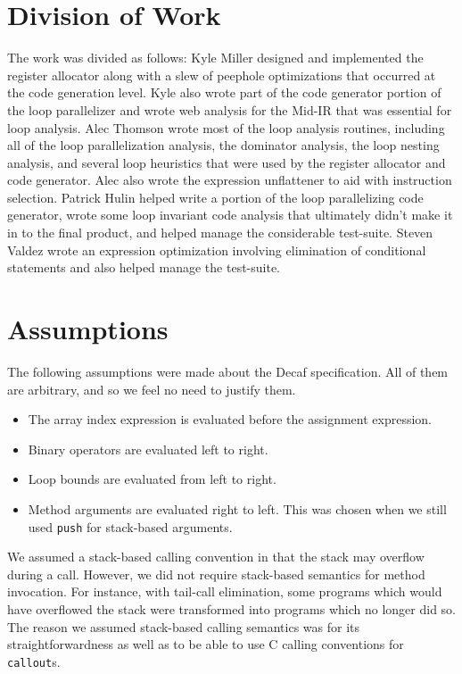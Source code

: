 \documentclass[11pt]{article}
\begin{document}
\section {Division of Work}

The work was divided as follows: Kyle Miller designed and implemented
the register allocator along with a slew of peephole optimizations
that occurred at the code generation level. Kyle also wrote part of
the code generator portion of the loop parallelizer and wrote web
analysis for the Mid-IR that was essential for loop analysis. Alec Thomson wrote most of
the loop analysis routines, including all of the loop parallelization
analysis, the dominator analysis, the loop nesting analysis, and
several loop heuristics that were used by the register allocator and
code generator. Alec
also wrote the expression unflattener to aid with instruction
selection. Patrick Hulin helped write a portion of the loop
parallelizing code generator, wrote some loop invariant code analysis
that ultimately didn't make it in to the final product, and helped
manage the considerable test-suite. Steven Valdez wrote an expression
optimization involving elimination of conditional statements and also
helped manage the test-suite.

\section{Assumptions}

The following assumptions were made about the Decaf specification.
All of them are arbitrary, and so we feel no need to justify them.
\begin{itemize}
\item The array index expression is evaluated before the assignment
  expression.
\item Binary operators are evaluated left to right.
\item Loop bounds are evaluated from left to right.
\item Method arguments are evaluated right to left.  This was chosen
  when we still used \texttt{push} for stack-based arguments.
\end{itemize}

We assumed a stack-based calling convention in that the stack may
overflow during a call.  However, we did not require stack-based
semantics for method invocation.  For instance, with tail-call
elimination, some programs which would have overflowed the stack were
transformed into programs which no longer did so.  The reason we
assumed stack-based calling semantics was for its straightforwardness
as well as to be able to use C calling conventions for
\texttt{callout}s.
\end{document}
